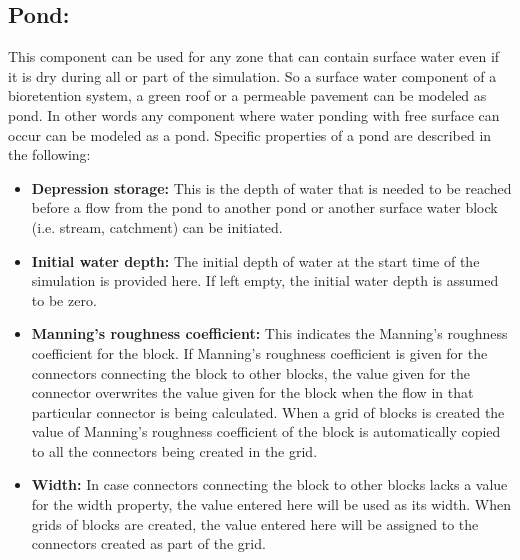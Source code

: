 \subsection{Pond: } This component can be used for any zone that can contain surface water even if it is dry during all or part of the simulation. So a surface water component of a bioretention system, a green roof or a permeable pavement can be modeled as pond. In other words any component where water ponding with free surface can occur can be modeled as a pond. Specific properties of a pond are described in the following:
\begin{itemize}
\item \textbf{Depression storage: } This is the depth of water that is needed to be reached before a flow from the pond to another pond or another surface water block (i.e. stream, catchment) can be initiated. 
\item \textbf{Initial water depth: } The initial depth of water at the start time of the simulation is provided here. If left empty, the initial water depth is assumed to be zero. 
\item \textbf{Manning's roughness coefficient: } This indicates the Manning's roughness coefficient for the block. If Manning's roughness coefficient is given for the connectors connecting the block to other blocks, the value given for the connector overwrites the value given for the block when the flow in that particular connector is being calculated. When a grid of blocks is created the value of Manning's roughness coefficient of the block is automatically copied to all the connectors being created in the grid.
\item \textbf{Width: } In case connectors connecting the block to other blocks lacks a value for the width property, the value entered here will be used as its width. When grids of blocks are created, the value entered here will be assigned to the connectors created as part of the grid. 
\end{itemize}
